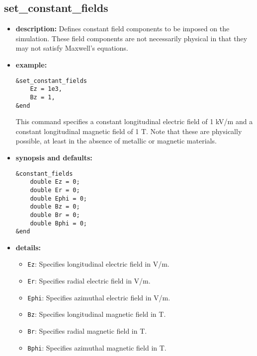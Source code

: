 %
\newpage

\subsection{set\_constant\_fields}

\begin{itemize}

\item {\bf description:}
Defines constant field components to be imposed on the simulation.
These field components are not necessarily physical in that they may
not satisfy Maxwell's equations.

\item {\bf example:} 
\begin{verbatim}
&set_constant_fields
    Ez = 1e3,
    Bz = 1,
&end
\end{verbatim}
This command specifies a constant longitudinal electric field
of 1 kV/m and a constant longitudinal magnetic field of 1 T.
Note that these are physically possible, at least in the absence
of metallic or magnetic materials.

\item {\bf synopsis and defaults:} 
\begin{verbatim}
&constant_fields
    double Ez = 0;
    double Er = 0;
    double Ephi = 0;
    double Bz = 0;
    double Br = 0;
    double Bphi = 0;
&end
\end{verbatim}

\item {\bf details:} 
\begin{itemize}
\item {\tt Ez}: Specifies longitudinal electric field in V/m.
\item {\tt Er}: Specifies radial electric field in V/m.
\item {\tt Ephi}: Specifies azimuthal electric field in V/m.
\item {\tt Bz}: Specifies longitudinal magnetic field in T.
\item {\tt Br}: Specifies radial magnetic field in T.
\item {\tt Bphi}: Specifies azimuthal magnetic field in T.
\end{itemize}

\end{itemize}
